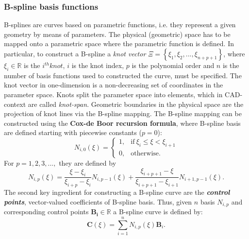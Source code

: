 \documentclass[3p]{article}
\begin{document}
\subsubsection*{B-spline basis functions}
B-splines are curves based on parametric functions, i.e. they represent a given geometry by means of parameters. The physical (geometric) space has to be mapped onto a parametric space where the parametric function is defined. In particular, to construct a B-spline a \textit{knot vector} $\Xi=\left\lbrace\xi_{1},\xi_{2},...,\xi_{n+p+1}\right\rbrace$, where $\xi_{i} \in \mathbb{R}$ is the $i^{th} knot$, $i$ is the knot index, $p$ is the polynomial order and $n$ is the number of basis functions used to constructed the curve, must be specified. The knot vector in one-dimension is a non-decreasing set of coordinates in the parameter space. Knots split the parameter space into elements, which in CAD-context are called \textit{knot-span}. Geometric boundaries in the physical space are the projection of knot lines via the B-spline mapping.
The B-spline mapping can be constructed using the \textbf{Cox-de Boor recursion formula}, where B-spline basis are defined starting with piecewise constants ($p=0$):
\begin{equation}
N_{i,0}(\xi)= 
\begin{cases}
      1, & \text{if}\ \xi_{i} \leqslant \xi < \xi_{i+1} \\
      0, & \text{otherwise}.
\end{cases}
\end{equation}
For $p=1,2,3,...,$ they are defined by
\begin{equation}
N_{i,p}(\xi) = \dfrac{\xi-\xi_{i}}{\xi_{i+p}-\xi_{i}}N_{i,p-1}(\xi)+\dfrac{\xi_{i+p+1}-\xi}{\xi_{i+p+1}-\xi_{i+1}}N_{i+1,p-1}(\xi).
\end{equation}
The second key ingredient for constructing a B-spline curve are the \textbf{\textit{control points}}, vector-valued coefficients of B-spline basis. Thus, given $n$ basis $N_{i,p}$ and corresponding control points $\mathbf{B_{i}}\in\mathbb{R}$ a B-spline curve is defined by:
\begin{equation}
\mathbf{C}(\xi) = \sum_{i=1}^{n}N_{i,p}(\xi)\mathbf{B}_{i}.
\end{equation}
\end{document}
